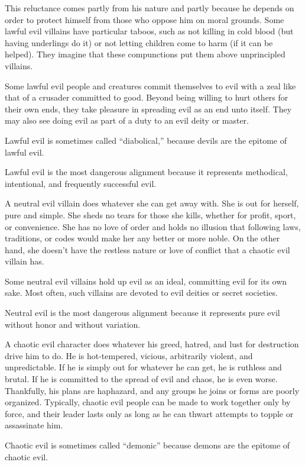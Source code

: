 This reluctance comes partly from his nature and partly because he depends on order to protect himself from those who oppose him on moral grounds. Some lawful evil villains have particular taboos, such as not killing in cold blood (but having underlings do it) or not letting children come to harm (if it can be helped). They imagine that these compunctions put them above unprincipled villains.

Some lawful evil people and creatures commit themselves to evil with a zeal like that of a crusader committed to good. Beyond being willing to hurt others for their own ends, they take pleasure in spreading evil as an end unto itself. They may also see doing evil as part of a duty to an evil deity or master.

Lawful evil is sometimes called ``diabolical,'' because devils are the epitome of lawful evil.

Lawful evil is the most dangerous alignment because it represents methodical, intentional, and frequently successful evil.

 A neutral evil villain does whatever she can get away with. She is out for herself, pure and simple. She sheds no tears for those she kills, whether for profit, sport, or convenience. She has no love of order and holds no illusion that following laws, traditions, or codes would make her any better or more noble. On the other hand, she doesn't have the restless nature or love of conflict that a chaotic evil villain has.

Some neutral evil villains hold up evil as an ideal, committing evil for its own sake. Most often, such villains are devoted to evil deities or secret societies.

Neutral evil is the most dangerous alignment because it represents pure evil without honor and without variation.

 A chaotic evil character does whatever his greed, hatred, and lust for destruction drive him to do. He is hot-tempered, vicious, arbitrarily violent, and unpredictable. If he is simply out for whatever he can get, he is ruthless and brutal. If he is committed to the spread of evil and chaos, he is even worse. Thankfully, his plans are haphazard, and any groups he joins or forms are poorly organized. Typically, chaotic evil people can be made to work together only by force, and their leader lasts only as long as he can thwart attempts to topple or assassinate him.

Chaotic evil is sometimes called ``demonic'' because demons are the epitome of chaotic evil.

